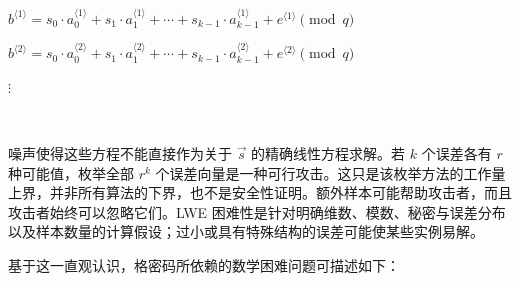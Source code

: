 $b^{\langle 1 \rangle} = s_0\cdot a_{0}^{\langle 1 \rangle} + s_1\cdot a_{1}^{\langle 1 \rangle} + \cdots + s_{k-1}\cdot a_{k-1}^{\langle 1 \rangle} + e^{\langle 1 \rangle} \pmod q$

$b^{\langle 2 \rangle} = s_0\cdot a_{0}^{\langle 2 \rangle} + s_1\cdot a_{1}^{\langle 2 \rangle} + \cdots + s_{k-1}\cdot a_{k-1}^{\langle 2 \rangle} + e^{\langle 2 \rangle} \pmod q$

\text{ } $\vdots$


$ $

噪声使得这些方程不能直接作为关于 $\vec s$ 的精确线性方程求解。若 $k$ 个误差各有 $r$ 种可能值，枚举全部 $r^k$ 个误差向量是一种可行攻击。这只是该枚举方法的工作量上界，并非所有算法的下界，也不是安全性证明。额外样本可能帮助攻击者，而且攻击者始终可以忽略它们。LWE 困难性是针对明确维数、模数、秘密与误差分布以及样本数量的计算假设；过小或具有特殊结构的误差可能使某些实例易解。

基于这一直观认识，格密码所依赖的数学困难问题可描述如下：

$ $

